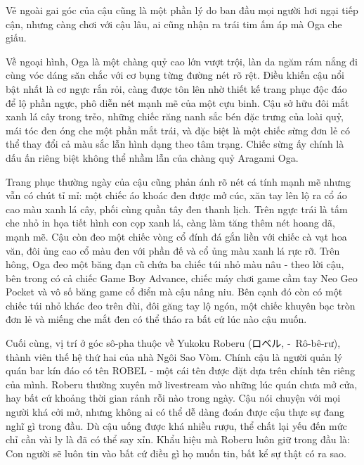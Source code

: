 \documentclass[../main.tex]{subfiles}
\begin{document}

Vẻ ngoài gai góc của cậu cũng là một phần lý do ban đầu mọi người hơi ngại tiếp cận, nhưng càng chơi với cậu lâu, ai cũng nhận ra trái tim ấm áp mà Oga che giấu.

Về ngoại hình, Oga là một chàng quỷ cao lớn vượt trội, làn da ngăm rám nắng đi cùng vóc dáng săn chắc với cơ bụng từng đường nét rõ rệt. Điều khiến cậu nổi bật nhất là cơ ngực rắn rỏi, càng được tôn lên nhờ thiết kế trang phục độc đáo để lộ phần ngực, phô diễn nét mạnh mẽ của một cựu binh. Cậu sở hữu đôi mắt xanh lá cây trong trẻo, những chiếc răng nanh sắc bén đặc trưng của loài quỷ, mái tóc đen óng che một phần mắt trái, và đặc biệt là một chiếc sừng đơn lẻ có thể thay đổi cả màu sắc lẫn hình dạng theo tâm trạng. Chiếc sừng ấy chính là dấu ấn riêng biệt không thể nhầm lẫn của chàng quỷ Aragami Oga.

Trang phục thường ngày của cậu cũng phản ánh rõ nét cá tính mạnh mẽ nhưng vẫn có chút tỉ mỉ: một chiếc áo khoác đen được mở cúc, xăn tay lên lộ ra cổ áo cao màu xanh lá cây, phối cùng quần tây đen thanh lịch. Trên ngực trái là tấm che nhỏ in họa tiết hình con cọp xanh lá, càng làm tăng thêm nét hoang dã, mạnh mẽ. Cậu còn đeo một chiếc vòng cổ đính đá gắn liền với chiếc cà vạt hoa văn, đôi ủng cao cổ màu đen với phần đế và cổ ủng màu xanh lá rực rỡ. Trên hông, Oga đeo một băng đạn cũ chứa ba chiếc túi nhỏ màu nâu - theo lời cậu, bên trong có cả chiếc Game Boy Advance, chiếc máy chơi game cầm tay Neo Geo Pocket và vô số băng game cổ điển mà cậu nâng niu. Bên cạnh đó còn có một chiếc túi nhỏ khác đeo trên đùi, đôi găng tay lộ ngón, một chiếc khuyên bạc tròn đơn lẻ và miếng che mắt đen có thể tháo ra bất cứ lúc nào cậu muốn.

Cuối cùng, vị trí ở góc sô-pha thuộc về Yukoku Roberu (ロベル, -\ Rô-bê-rư), thành viên thế hệ thứ hai của nhà Ngôi Sao Vòm. Chính cậu là người quản lý quán bar kín đáo có tên ROBEL - một cái tên được đặt dựa trên chính tên riêng của mình. Roberu thường xuyên mở livestream vào những lúc quán chưa mở cửa, hay bất cứ khoảng thời gian rảnh rỗi nào trong ngày. Cậu nói chuyện với mọi người khá cởi mở, nhưng không ai có thể dễ dàng đoán được cậu thực sự đang nghĩ gì trong đầu. Dù cậu uống được khá nhiều rượu, thể chất lại yếu đến mức chỉ cần vài ly là đã có thể say xỉn. Khẩu hiệu mà Roberu luôn giữ trong đầu là: Con người sẽ luôn tin vào bất cứ điều gì họ muốn tin, bất kể sự thật có ra sao.

\end{document}
